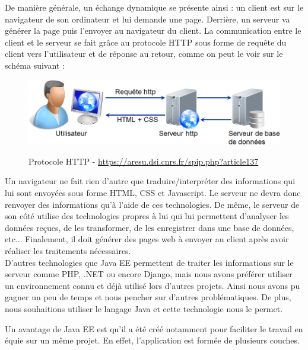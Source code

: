 De manière générale, un échange dynamique se présente ainsi : un client est sur le navigateur de son ordinateur et lui demande une page. Derrière, un serveur va générer la page puis l'envoyer au navigateur du client.
La communication entre le client et le serveur se fait grâce au protocole HTTP sous forme de requête du client vers l'utilisateur et de réponse au retour, comme on peut le voir sur le schéma suivant :
\begin{figure}[H]
  \center
  \includegraphics[scale=0.5]{../graph/protocoleHTTP.png} \\
  \caption{Protocole HTTP - \url{https://aresu.dsi.cnrs.fr/spip.php?article137}}
\end{figure}
Un navigateur ne fait rien d'autre que traduire/interpréter des informations qui lui sont envoyées sous forme HTML, CSS et Javascript. Le serveur ne devra donc renvoyer des informations qu'à l'aide de ces technologies.
De même, le serveur de son côté utilise des technologies propres à lui qui lui permettent d'analyser les données reçues, de les transformer, de les enregistrer dans une base de données, etc... Finalement, il doit générer des pages web à envoyer au client après avoir réaliser les traitements nécessaires.\\

D'autres technologies que Java EE permettent de traiter les informations sur le serveur comme PHP, .NET ou encore Django, mais nous avons préférer utiliser un environnement connu et déjà utilisé lors d'autres projets. Ainsi nous avons pu gagner un peu de temps et nous pencher sur d'autres problématiques. De plus, nous souhaitions utiliser le langage Java et cette technologie nous le permet.

Un avantage de Java EE est qu'il a été créé notamment pour faciliter le travail en équie sur un même projet. En effet, l'application est formée de plusieurs couches.

